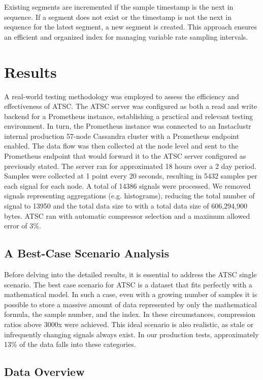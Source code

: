 \documentclass[conference]{IEEEtran}
\begin{document}
Existing segments are incremented if the sample timestamp is the next in sequence. If a segment does not exist or the timestamp is not the next in sequence for the latest segment, a new segment is created. This approach ensures an efficient and organized index for managing variable rate sampling intervals.

\section{Results}

A real-world testing methodology was employed to assess the efficiency and effectiveness of ATSC. The ATSC server was configured as both a read and write backend for a Prometheus\cite{prometheus} instance, establishing a practical and relevant testing environment. 
In turn, the Prometheus instance was connected to an Instaclustr internal production 57-node Cassandra\cite{cassandra} cluster with a Prometheus endpoint enabled. The data flow was then collected at the node level and sent to the Prometheus endpoint that would forward it to the ATSC server configured as previously stated.
The server ran for approximated 18 hours over a 2 day period. Samples were collected at 1 point every 20 seconds, resulting in 5432 samples per each signal for each node. A total of 14386 signals were processed.
We removed signals representing aggregations (e.g. histograms), reducing the total number of signal to 13950 and the total data size to  with a total data size of 606,294,900 bytes.
ATSC ran with automatic compressor selection and a maximum allowed error of 3\%.

\subsection{A Best-Case Scenario Analysis}

Before delving into the detailed results, it is essential to address the ATSC single scenario.
The best case scenario for ATSC is a dataset that fits perfectly with a mathematical model.
In such a case, even with a growing number of samples it is possible to store a massive amount of data represented by only the mathematical formula, the sample number, and the index. In these circumstances, compression ratios above 3000x were achieved.
This ideal scenario is also realistic, as stale or infrequently changing signals always exist.
In our production tests, approximately 13\% of the data falls into these categories.

\subsection{Data Overview}
\end{document}
